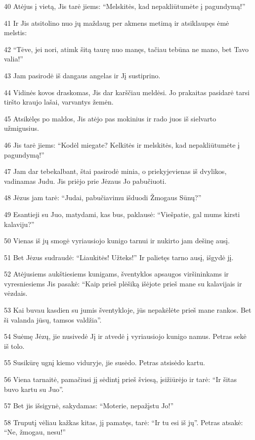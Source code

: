 \par 40 Atėjus į vietą, Jis tarė jiems: “Melskitės, kad nepakliūtumėte į pagundymą!” 
\par 41 Ir Jis atsitolino nuo jų maždaug per akmens metimą ir atsiklaupęs ėmė melstis: 
\par 42 “Tėve, jei nori, atimk šitą taurę nuo manęs, tačiau tebūna ne mano, bet Tavo valia!” 
\par 43 Jam pasirodė iš dangaus angelas ir Jį sustiprino. 
\par 44 Vidinės kovos draskomas, Jis dar karščiau meldėsi. Jo prakaitas pasidarė tarsi tiršto kraujo lašai, varvantys žemėn. 
\par 45 Atsikėlęs po maldos, Jis atėjo pas mokinius ir rado juos iš sielvarto užmigusius. 
\par 46 Jis tarė jiems: “Kodėl miegate? Kelkitės ir melskitės, kad nepakliūtumėte į pagundymą!” 
\par 47 Jam dar tebekalbant, štai pasirodė minia, o priekyje­vienas iš dvylikos, vadinamas Judu. Jis priėjo prie Jėzaus Jo pabučiuoti. 
\par 48 Jėzus jam tarė: “Judai, pabučiavimu išduodi Žmogaus Sūnų?” 
\par 49 Esantieji su Juo, matydami, kas bus, paklausė: “Viešpatie, gal mums kirsti kalaviju?” 
\par 50 Vienas iš jų smogė vyriausiojo kunigo tarnui ir nukirto jam dešinę ausį. 
\par 51 Bet Jėzus sudraudė: “Liaukitės! Užteks!” Ir palietęs tarno ausį, išgydė jį. 
\par 52 Atėjusiems aukštiesiems kunigams, šventyklos apsaugos viršininkams ir vyresniesiems Jis pasakė: “Kaip prieš plėšiką išėjote prieš mane su kalavijais ir vėzdais. 
\par 53 Kai buvau kasdien su jumis šventykloje, jūs nepakėlėte prieš mane rankos. Bet ši valanda jūsų, tamsos valdžia”. 
\par 54 Suėmę Jėzų, jie nusivedė Jį ir atvedė į vyriausiojo kunigo namus. Petras sekė iš tolo. 
\par 55 Susikūrę ugnį kiemo viduryje, jie susėdo. Petras atsisėdo kartu. 
\par 56 Viena tarnaitė, pamačiusi jį sėdintį prieš šviesą, įsižiūrėjo ir tarė: “Ir šitas buvo kartu su Juo”. 
\par 57 Bet jis išsigynė, sakydamas: “Moterie, nepažįstu Jo!” 
\par 58 Truputį vėliau kažkas kitas, jį pamatęs, tarė: “Ir tu esi iš jų”. Petras atsakė: “Ne, žmogau, nesu!” 
